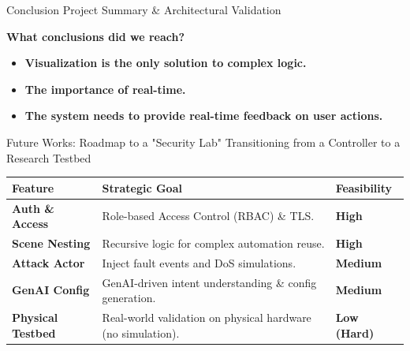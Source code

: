 \documentclass[aspectratio=169, 10pt, xcolor=table]{beamer}
\begin{document}
\begin{frame}{Conclusion}
    {Project Summary \& Architectural Validation}

    \Large \color{FUblue} \textbf{What conclusions did we reach?}
    \vspace{1em}
    \normalsize
    \begin{itemize}[<+->]
        \setlength\itemsep{1.5em}
        \item \textbf{Visualization is the only solution to complex logic.}
        \item \textbf{The importance of real-time.}
        \item \textbf{The system needs to provide real-time feedback on user actions.}
    \end{itemize}
\end{frame}

\begin{frame}{Future Works: Roadmap to a "Security Lab"}
    {Transitioning from a Controller to a Research Testbed}
    \renewcommand{\arraystretch}{1.1} %
    \centering
    \footnotesize
    \begin{tabular}{l p{6cm} l}
        \toprule
        \textbf{Feature} & \textbf{Strategic Goal} & \textbf{Feasibility} \\
        \midrule
        \rowcolor{FUgray}
        \textbf{Auth \& Access} & Role-based Access Control (RBAC) \& TLS. & \textbf{High} \\
        \textbf{Scene Nesting} & Recursive logic for complex automation reuse. & \textbf{High} \\
        \rowcolor{FUgray}
        \textbf{Attack Actor} & Inject fault events and DoS simulations. & \textbf{Medium} \\
        \textbf{GenAI Config} & GenAI-driven intent understanding \& config generation. & \textbf{Medium} \\
        \rowcolor{FUgray}
        \textbf{Physical Testbed} & Real-world validation on physical hardware (no simulation). & \textbf{Low (Hard)} \\
        \bottomrule
    \end{tabular}
\end{frame}
\end{document}
